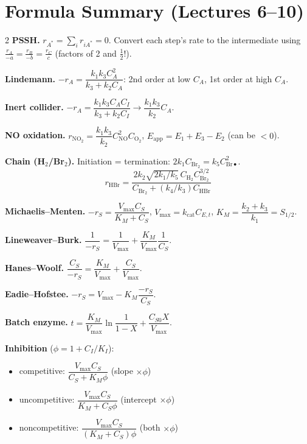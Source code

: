 \documentclass[11pt]{article}
\begin{document}
\newpage
\section{Formula Summary (Lectures 6--10)}
\small
\begin{multicols}{2}
\textbf{PSSH.} $r_{A^*}=\sum_ir_{iA^*}=0$. Convert each step's rate to the intermediate using
$\frac{r_A}{-a}=\frac{r_B}{-b}=\frac{r_C}{c}$ (factors of 2 and $\tfrac12$!).

\textbf{Lindemann.} $-r_A=\dfrac{k_1k_3C_A^2}{k_3+k_2C_A}$: 2nd order at low $C_A$, 1st order at high $C_A$.

\textbf{Inert collider.} $-r_A=\dfrac{k_1k_3C_AC_I}{k_3+k_2C_I}\to\dfrac{k_1k_3}{k_2}C_A$.

\textbf{NO oxidation.} $r_{\mathrm{NO_2}}=\dfrac{k_1k_3}{k_2}C_{\mathrm{NO}}^2C_{\mathrm{O_2}}$, \;$E_{\text{app}}=E_1+E_3-E_2$ (can be $<0$).

\textbf{Chain (H$_2$/Br$_2$).} Initiation = termination: $2k_1C_{\mathrm{Br_2}}=k_5C_{\mathrm{Br}\bullet}^2$.
\[
r_{\mathrm{HBr}}=\frac{2k_2\sqrt{2k_1/k_5}\,C_{\mathrm{H_2}}C_{\mathrm{Br_2}}^{3/2}}{C_{\mathrm{Br_2}}+(k_4/k_3)C_{\mathrm{HBr}}}
\]

\textbf{Michaelis--Menten.} $-r_S=\dfrac{V_{\max}C_S}{K_M+C_S}$, \;$V_{\max}=k_{\text{cat}}C_{E,t}$,
\;$K_M=\dfrac{k_2+k_3}{k_1}=S_{1/2}$.

\textbf{Lineweaver--Burk.} $\dfrac{1}{-r_S}=\dfrac{1}{V_{\max}}+\dfrac{K_M}{V_{\max}}\dfrac{1}{C_S}$.

\textbf{Hanes--Woolf.} $\dfrac{C_S}{-r_S}=\dfrac{K_M}{V_{\max}}+\dfrac{C_S}{V_{\max}}$.

\textbf{Eadie--Hofstee.} $-r_S=V_{\max}-K_M\dfrac{-r_S}{C_S}$.

\textbf{Batch enzyme.} $t=\dfrac{K_M}{V_{\max}}\ln\dfrac{1}{1-X}+\dfrac{C_{S0}X}{V_{\max}}$.

\textbf{Inhibition} ($\phi=1+C_I/K_I$):
\begin{itemize}[leftmargin=*]
\item competitive: $\dfrac{V_{\max}C_S}{C_S+K_M\phi}$ (slope $\times\phi$)
\item uncompetitive: $\dfrac{V_{\max}C_S}{K_M+C_S\phi}$ (intercept $\times\phi$)
\item noncompetitive: $\dfrac{V_{\max}C_S}{(K_M+C_S)\phi}$ (both $\times\phi$)
\end{itemize}
\vfill
\columnbreak


\end{multicols}
\end{document}
